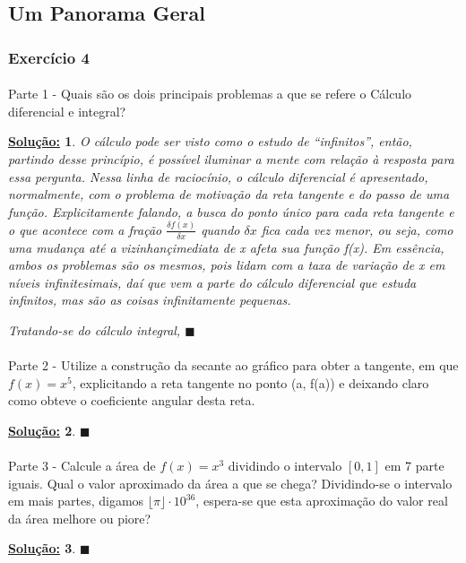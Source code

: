 \documentclass{article}
\newtheorem*{sol*}{\underline{Solu\c c\~ao:}}
\renewcommand\qedsymbol{$\blacksquare$}
\begin{document}
\subsection{Um Panorama Geral}
\subsubsection{Exerc\'icio 4}
\paragraph{} Parte 1 - Quais s\~ao os dois principais problemas a que se refere o C\'alculo diferencial e integral?
\begin{sol*}
O c\'alculo pode ser visto como o estudo de ``infinitos'', ent\~ao, partindo desse princ\'ipio, \'e poss\'ivel iluminar a mente com rela\c c\~ao \`a resposta para essa pergunta. Nessa linha de racioc\'inio, o c\'alculo diferencial \'e apresentado, normalmente, com o problema de motiva\c c\~ao da reta tangente e do passo de uma fun\c c\~ao. Explicitamente falando, a busca do ponto \'unico para cada reta tangente e o que acontece com a fra\c c\~ao $\frac{\delta{f(x)}}{\delta{x}}$ quando $\delta{x}$ fica cada vez menor, ou seja, como uma mudan\c ca at\'e a vizinhan\c c\a imediata de x afeta sua fun\c c\~ao f(x). Em ess\^encia, ambos os problemas s\~ao os mesmos, pois lidam com a taxa de varia\c c\~ao de x em n\'iveis infinitesimais, da\'i que vem a parte do c\'alculo diferencial que estuda infinitos, mas s\~ao as coisas infinitamente pequenas.

Tratando-se do c\'alculo integral, 
\qedsymbol
\end{sol*}

\paragraph{} Parte 2 - Utilize a constru\c c\~ao da secante ao gr\'afico para obter a tangente, em que $f(x) = x^5$, explicitando a reta tangente no ponto (a, f(a)) e deixando claro como obteve o coeficiente angular desta reta.
\begin{sol*}

\qedsymbol
\end{sol*}
\paragraph{} Parte 3 - Calcule a \'area de $f(x) = x^3$ dividindo o intervalo $[0, 1]$ em 7 parte iguais. Qual o valor aproximado da \'area a que se chega? Dividindo-se o intervalo em mais partes, digamos $\lfloor{\pi}\rfloor\cdot{10^{36}}$, espera-se que esta aproxima\c c\~ao do valor real da \'area melhore ou piore?
\begin{sol*}

\qedsymbol
\end{sol*}
\end{document}
